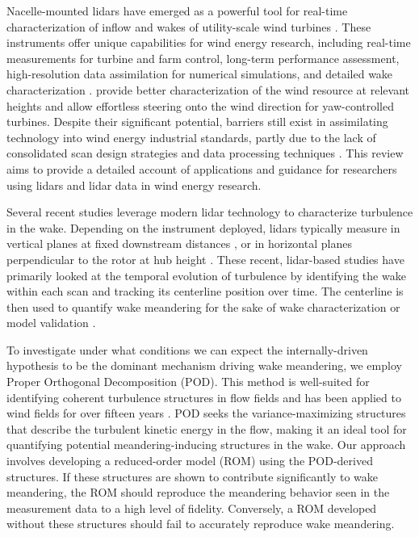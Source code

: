 \documentclass[%
 aip,
 amsmath,
 amssymb,
preprint,%
]{revtex4-2}
\begin{document}
Nacelle-mounted lidars have emerged as a powerful tool for real-time characterization of inflow and wakes of utility-scale wind turbines \cite{letizia2023characterization}. These instruments offer unique capabilities for wind energy research, including real-time measurements for turbine and farm control, long-term performance assessment, high-resolution data assimilation for numerical simulations, and detailed wake characterization \cite{trujillo_light_2011, kumer2015characterisation, bodini2017three, zhan2020lidar, iungo2013field,iungo2014volumetric, doubrawa2020multimodel, letizia2021lisboa}. provide better characterization of the wind resource at relevant heights and allow effortless steering onto the wind direction for yaw-controlled turbines. Despite their significant potential, barriers still exist in assimilating  technology into wind energy industrial standards, partly due to the lack of consolidated scan design strategies and data processing techniques \cite{clifton2018iea, simley2018optimizing}. This review aims to provide a detailed account of  applications and guidance for researchers using lidars and lidar data in wind energy research.

Several recent studies leverage modern lidar technology to characterize turbulence in the wake. 
Depending on the instrument deployed, lidars typically measure in vertical planes at fixed downstream distances \cite{conti_wind_2020, doubrawa2020multimodel, conti_calibration_2021}, or in horizontal planes perpendicular to the rotor at hub height \cite{reinwardt_dynamic_2020, reinwardt_validation_2021}. 
These recent, lidar-based studies have primarily looked at the temporal evolution of turbulence by identifying the wake within each scan and tracking its centerline position over time. 
The centerline is then used to quantify wake meandering for the sake of wake characterization \cite{conti_wind_2020} or model validation \cite{doubrawa2020multimodel}.
\cite{beckDynamicDataFiltering2017, beckTemporalUpSamplingPlanar2019}

To investigate under what conditions we can expect the internally-driven hypothesis to be the dominant mechanism driving wake meandering, we employ Proper Orthogonal Decomposition (POD). 
This method is well-suited for identifying coherent turbulence structures in flow fields \cite{berkooz_proper_1993} and has been applied to wind fields for over fifteen years \cite{spitler_initial_2004, saranyasoontorn_low-dimensional_2005, hamilton2015wind, hamilton2016low, verhulst_large_2014}. 
POD seeks the variance-maximizing structures that describe the turbulent kinetic energy in the flow, making it an ideal tool for quantifying potential meandering-inducing structures in the wake.
Our approach involves developing a reduced-order model (ROM) using the POD-derived structures. 
If these structures are shown to contribute significantly to wake meandering, the ROM should reproduce the meandering behavior seen in the measurement data to a high level of fidelity. 
Conversely, a ROM developed without these structures should fail to accurately reproduce wake meandering.
\end{document}
